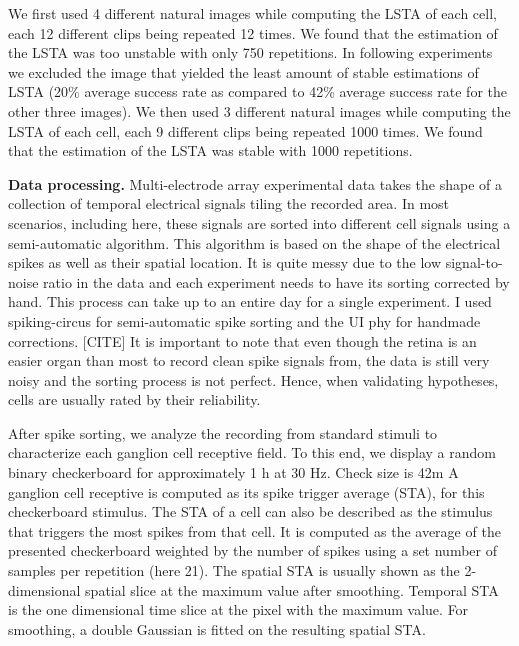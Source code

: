 We first used 4 different natural images while computing the LSTA of each cell,
each 12 different clips being repeated 12 times. We found that the estimation
of the LSTA was too unstable with only 750 repetitions. In following
experiments we excluded the image that yielded the least amount of stable
estimations of LSTA (20\% average success rate as compared to 42\% average
success rate for the other three images). We then used 3 different natural
images while computing the LSTA of each cell, each 9 different clips being
repeated 1000 times. We found that the estimation of the LSTA was stable with
1000 repetitions.

\textbf{Data processing.}
Multi-electrode array experimental data takes the shape of a collection of
temporal electrical signals tiling the recorded area.
In most scenarios, including here, these signals are sorted into different cell
signals using a semi-automatic algorithm. This algorithm is based on the shape
of the electrical spikes as well as their spatial location. It is
quite messy due to the low signal-to-noise ratio in the data and each
experiment
needs to have its sorting corrected by hand. This process can take up to an
entire day for a single experiment. I used spiking-circus for semi-automatic
spike sorting and the UI phy for handmade corrections. [CITE]
It is important to note that even though the retina is an easier organ than
most to record clean spike signals from, the data is still very noisy and the
sorting process is not perfect. Hence, when validating hypotheses, cells are
usually rated by their reliability.

After spike sorting, we analyze the recording from standard stimuli to
characterize each
ganglion cell receptive field. To this end, we display a random binary
checkerboard for approximately 1 h at 30 Hz. Check size is 42\textmu m A
ganglion cell receptive is computed as its spike trigger average (STA), for
this checkerboard stimulus. The STA of a cell can also be described as the
stimulus that triggers the most spikes from that cell. It is computed as the
average of the presented checkerboard weighted by the number of spikes using a
set number of samples per repetition (here 21). The spatial STA is usually
shown as the 2-dimensional spatial slice at the maximum value after smoothing.
Temporal STA is the one dimensional time slice at the pixel with the maximum
value. For smoothing, a double Gaussian is fitted on the resulting spatial
STA.


